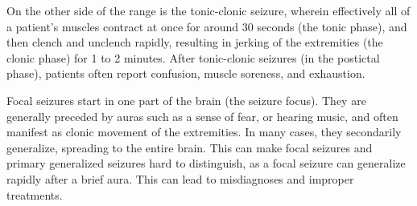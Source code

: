 On the other side of the range is the tonic-clonic seizure, wherein effectively all of a patient's muscles contract at once for around 30 seconds (the tonic phase), and then clench and unclench rapidly, resulting in jerking of the extremities (the clonic phase) for 1 to 2 minutes.
After tonic-clonic seizures (in the postictal phase), patients often report confusion, muscle soreness, and exhaustion.

Focal seizures start in one part of the brain (the seizure focus).
They are generally preceded by auras such as a sense of fear, or hearing music, and often manifest as clonic movement of the extremities.
In many cases, they secondarily generalize, spreading to the entire brain.
This can make focal seizures and primary generalized seizures hard to distinguish, as a focal seizure can generalize rapidly after a brief aura.
This can lead to misdiagnoses and improper treatments.

